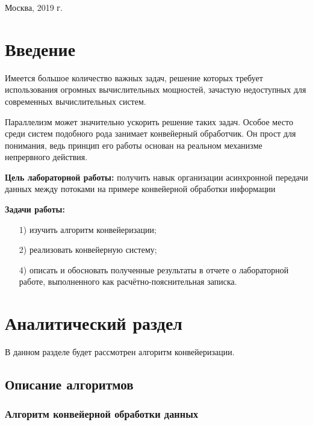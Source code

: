 \documentclass[a4paper,12pt]{article}
\begin{document}
\vspace*{40mm}
\begin{center}
	Москва, 2019 г.  
\end{center}
\thispagestyle{empty}


\tableofcontents

\section*{Введение}

Имеется большое количество важных задач, решение которых требует использования 
огромных вычислительных мощностей, зачастую недоступных для современных 
вычислительных систем.

Параллелизм может значительно ускорить решение
таких задач. Особое место среди систем подобного рода занимает
конвейерный обработчик. Он прост для понимания,
ведь принцип его работы основан на реальном механизме
непрервного действия. ~\cite{voev}

\textbf{Цель лабораторной работы:} получить навык организации асинхронной передачи 
данных между потоками на примере конвейерной обработки информации

\textbf{Задачи работы:}

\begin{enumerate} 
	\item[1)] изучить алгоритм конвейеризации;
	\item[2)] реализовать конвейерную систему;
	\item[4)] описать и обосновать полученные результаты в отчете о лабораторной 
	работе, выполненного как расчётно-пояснительная записка. 
\end{enumerate} 
\pagebreak

\section{Аналитический раздел}

В данном разделе будет рассмотрен алгоритм конвейеризации.

\subsection{Описание алгоритмов}

\subsubsection{Алгоритм конвейерной обработки данных}
\end{document}
